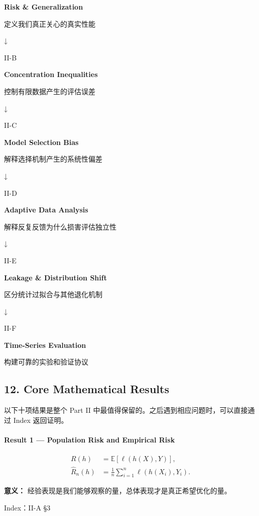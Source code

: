 \textbf{Risk \& Generalization}

定义我们真正关心的真实性能

↓

II-B

\textbf{Concentration Inequalities}

控制有限数据产生的评估误差

↓

II-C

\textbf{Model Selection Bias}

解释选择机制产生的系统性偏差

↓

II-D

\textbf{Adaptive Data Analysis}

解释反复反馈为什么损害评估独立性

↓

II-E

\textbf{Leakage \& Distribution Shift}

区分统计过拟合与其他退化机制

↓

II-F

\textbf{Time-Series Evaluation}

构建可靠的实验和验证协议

\hypertarget{part-2-27-0001-core-mathematical-results}{%
\subsection{12. Core Mathematical Results}\label{part-2-27-0001-core-mathematical-results}}

以下十项结果是整个 Part II 中最值得保留的。之后遇到相应问题时，可以直接通过 Index 返回证明。

\hypertarget{part-2-27-0001-result-1-population-risk-and-empirical-risk}{%
\paragraph{Result 1 --- Population Risk and Empirical Risk}\label{part-2-27-0001-result-1-population-risk-and-empirical-risk}}

\[\begin{aligned}
R(h)&=\mathbb E[\ell(h(X),Y)],\\
\widehat R_n(h)&=\frac1n\sum_{i=1}^n
\ell(h(X_i),Y_i).
\end{aligned}\]

\textbf{意义：} 经验表现是我们能够观察的量，总体表现才是真正希望优化的量。

Index：II-A §3

